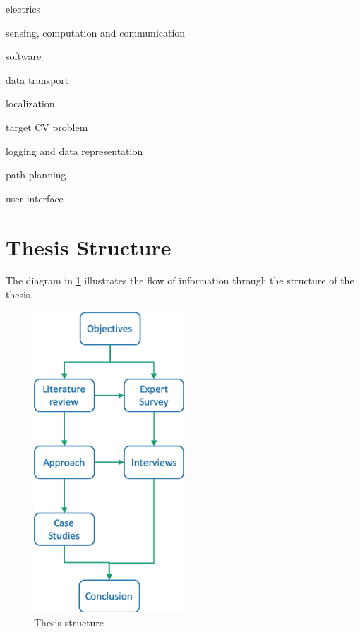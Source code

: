electrics



sensing, computation and communication



software



data transport



localization



target CV problem



logging and data representation



path planning



user interface




\section{Thesis Structure}
The diagram in \ref{fig:thesis-structure} illustrates the flow of information through the structure of the thesis.



\begin{figure}[htb!]
\centering \includegraphics[width=0.5\textwidth]{graphics/thesis-structure}
\caption{Thesis structure}
\label{fig:thesis-structure}
\end{figure}

